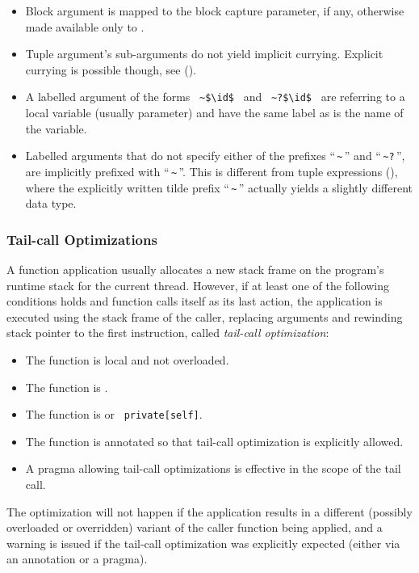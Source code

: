 \begin{itemize}
  \item Block argument is mapped to the block capture parameter, if any, otherwise made available only to . 
  \item Tuple argument's sub-arguments do not yield implicit currying. Explicit currying is possible though, see (). 
  \item A labelled argument of the forms ~\lstinline!~$\id$!~ and ~\lstinline!~?$\id$!~ are referring to a local variable (usually parameter) and have the same label as is the name of the variable.
  \item Labelled arguments that do not specify either of the prefixes ``\,\lstinline!~!\,'' and ``\,\lstinline!~?!\,'', are implicitly prefixed with ``\,\lstinline!~!\,''. This is different from tuple expressions (), where the explicitly written tilde prefix ``\,\lstinline!~!\,'' actually yields a slightly different data type. 
\end{itemize}





\subsubsection{Tail-call Optimizations}

A function application usually allocates a new stack frame on the program's runtime stack for the current thread. However, if at least one of the following conditions holds and function calls itself as its last action, the application is executed using the stack frame of the caller, replacing arguments and rewinding stack pointer to the first instruction, called {\em tail-call optimization}:
\begin{itemize}
  \item The function is local and not overloaded. 
  \item The function is . 
  \item The function is  or ~\lstinline!private[self]!. 
  \item The function is annotated so that tail-call optimization is explicitly allowed. 
  \item A pragma allowing tail-call optimizations is effective in the scope of the tail call. 
\end{itemize}
The optimization will not happen if the application results in a different (possibly overloaded or overridden) variant of the caller function being applied, and a warning is issued if the tail-call optimization was explicitly expected (either via an annotation or a pragma). 





